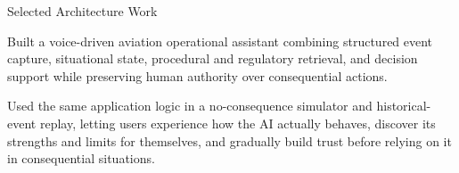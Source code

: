 \begin{rubric}{Selected Architecture Work}


  \entry*[]%
  Built a voice-driven aviation operational assistant combining structured event capture, situational
  state, procedural and regulatory retrieval, and decision support while preserving human authority
  over consequential actions.

  \entry*[]%
  Used the same application logic in a no-consequence simulator and historical-event replay, letting
  users experience how the AI actually behaves, discover its strengths and limits for themselves, and
  gradually build trust before relying on it in consequential situations.
\end{rubric}
